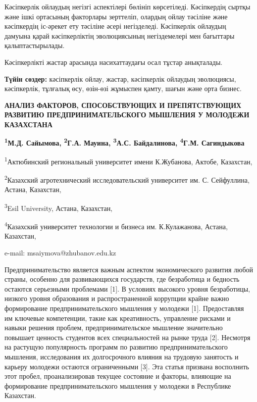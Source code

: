 Кәсіпкерлік ойлаудың негізгі аспектілері бөлініп көрсетіледі.
Кәсіпкердің сыртқы және ішкі ортасының факторлары зерттеліп, олардың
ойлау тәсіліне және кәсіпкердің іс-әрекет ету тәсіліне әсері
негізделеді. Кәсіпкерлік ойлаудың дамуына қарай кәсіпкерліктің
эволюциясының негіздемелері мен бағыттары қалыптастырылады.

Кәсіпкерлікті жастар арасында насихаттаудағы осал тұстар анықталады.

{\bfseries Түйін сөздер:} кәсіпкерлік ойлау, жастар, кәсіпкерлік ойлаудың
эволюциясы, кәсіпкерлік, тұлғалық өсу, өзін-өзі жұмыспен қамту, шағын
және орта бизнес.
\begin{articleheader}

{\bfseries АНАЛИЗ ФАКТОРОВ, СПОСОБСТВУЮЩИХ И ПРЕПЯТСТВУЮЩИХ РАЗВИТИЮ ПРЕДПРИНИМАТЕЛЬСКОГО МЫШЛЕНИЯ У МОЛОДЕЖИ КАЗАХСТАНА}

{\bfseries \textsuperscript{1}М.Д. Сайымова\textsuperscript{\envelope },
\textsuperscript{2}Г.А. Мауина, \textsuperscript{3}А.С. Байдалинова,
\textsuperscript{4}Г.М. Сагиндыкова}
\end{articleheader}
\begin{affiliation}

\textsuperscript{1}Актюбинский региональный университет имени
К.Жубанова, Актобе, Казахстан,

\textsuperscript{2}Казахский агротехнический исследовательский
университет им. С. Сейфуллина, Астана, Казахстан,

\textsuperscript{3}Esil University, Астана, Казахстан,

\textsuperscript{4}Казахский университет технологии и бизнеса им.
К.Кулажанова, Астана, Казахстан,

e-mail: msaiymova@zhubanov.edu.kz
\end{affiliation}

Предпринимательство является важным аспектом экономического развития
любой страны, особенно для развивающихся государств, где безработица и
бедность остаются серьезными проблемами {[}1{]}. В условиях высокого
уровня безработицы, низкого уровня образования и распространенной
коррупции крайне важно формирование предпринимательского мышления у
молодежи {[}1{]}. Предоставляя им ключевые компетенции, такие как
креативность, управление рисками и навыки решения проблем,
предпринимательское мышление значительно повышает ценность студентов
всех специальностей на рынке труда {[}2{]}. Несмотря на растущую
популярность программ по развитию предпринимательского мышления,
исследования их долгосрочного влияния на трудовую занятость и карьеру
молодежи остаются ограниченными {[}3{]}. Эта статья призвана восполнить
этот пробел, проанализировав текущее состояние и факторы, влияющие на
формирование предпринимательского мышления у молодежи в Республике
Казахстан.

